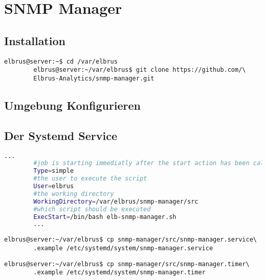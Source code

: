 \documentclass{article}
\begin{document}
	\newpage
	
	\section{SNMP Manager}
	\lstset{style=commands}
	\subsection{Installation}
	\begin{lstlisting}[caption={Clonen der Software von GitHub.}]
		elbrus@server:~$ cd /var/elbrus
		elbrus@server:~/var/elbrus$ git clone https://github.com/\
		Elbrus-Analytics/snmp-manager.git
	\end{lstlisting}

	\subsection[file config]{Umgebung Konfigurieren}
	
	\newpage
	\subsection[systemd service]{Der Systemd Service}
	\lstset{style=files}
	\begin{lstlisting}[caption={snmp-manager.service.example - Die Variable 'WorkingDirectory' sowie die Variable 'User' anpassen.},language=bash ,keywords={WorkingDirectory, User}, keywordstyle=\color{red}, firstnumber=5]
		...
		#job is starting immediatly after the start action has been called
		Type=simple
		#the user to execute the script
		User=elbrus
		#the working directory
		WorkingDirectory=/var/elbrus/snmp-manager/src
		#which script should be executed
		ExecStart=/bin/bash elb-snmp-manager.sh
		...
	\end{lstlisting}
	\lstset{style=commands}
	\begin{lstlisting}[caption={Kopieren des Serviceprogrammes}]
		elbrus@server:~/var/elbrus$ cp snmp-manager/src/snmp-manager.service\
		.example /etc/systemd/system/snmp-manager.service
	\end{lstlisting}
	
	\begin{lstlisting}[caption={Kopieren des Zeitplanungsprogrammes.}]
		elbrus@server:~/var/elbrus$ cp snmp-manager/src/snmp-manager.timer\
		.example /etc/systemd/system/snmp-manager.timer
	\end{lstlisting}
	
\end{document}

